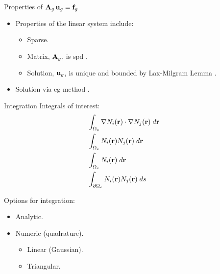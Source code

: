 \begin{frame}{Properties of $\mathbf{A}_g \, \mathbf{u}_g = \mathbf{f}_g$}
  \begin{itemize}
    \item Properties of the linear system include:
      \begin{itemize}
        \item Sparse.
        \item Matrix, $\mathbf{A}_g$, is \gls{spd} \cite{textbookhughes}.
        \item Solution, $\mathbf{u}_g$, is unique and bounded by Lax-Milgram Lemma 
          \cite{textbookli}.
      \end{itemize}
    \item Solution via \gls{cg} method \cite{Kelley1995IterativeEquations}.
  \end{itemize}
\end{frame}

\begin{frame}{Integration}
  Integrals of interest:
  \begin{align}
    &\int_{\Omega_e} \mathbf{\nabla} N_i(\mathbf{r}) \cdot \mathbf{\nabla} N_j(\mathbf{r}) 
      \;d\mathbf{r} \\
    &\int_{\Omega_e} N_i(\mathbf{r}) N_j(\mathbf{r}) \;d\mathbf{r} \\
    &\int_{\Omega_e} N_i(\mathbf{r}) \;d\mathbf{r} \\
    &\int_{\partial \Omega_e} N_i(\mathbf{r}) N_j(\mathbf{r}) \;ds &
  \end{align}

  Options for integration:
  \begin{itemize}
    \item Analytic.
    \item Numeric (quadrature).
    \begin{itemize}
      \item Linear (Gaussian).
      \item Triangular.
    \end{itemize}
  \end{itemize}
\end{frame}

